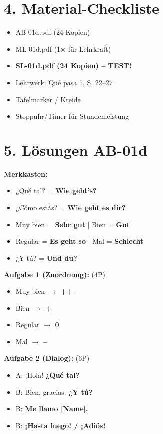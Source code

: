 \documentclass[11pt, a4paper]{article}
\newcommand{\sequenz}{01}
\newcommand{\block}{d}
\newcommand{\lerngruppengroesse}{24}
\newcommand{\loesung}[1]{\textcolor{loesung}{\textbf{#1}}}
\begin{document}
\section*{4. Material-Checkliste}

\begin{materialbox}
\begin{itemize}[label=$\square$]
    \item AB-\sequenz\block.pdf (\lerngruppengroesse{} Kopien)
    \item ML-\sequenz\block.pdf (1× für Lehrkraft)
    \item \textbf{SL-\sequenz\block.pdf (\lerngruppengroesse{} Kopien) -- TEST!}
    \item Lehrwerk: Qué pasa 1, S. 22--27
    \item Tafelmarker / Kreide
    \item Stoppuhr/Timer für Stundenleistung
\end{itemize}
\end{materialbox}

\section*{5. Lösungen AB-\sequenz\block}

\textbf{Merkkasten:}
\begin{itemize}
    \item ¿Qué tal? = \loesung{Wie geht's?}
    \item ¿Cómo estás? = \loesung{Wie geht es dir?}
    \item Muy bien = \loesung{Sehr gut} | Bien = \loesung{Gut}
    \item Regular = \loesung{Es geht so} | Mal = \loesung{Schlecht}
    \item ¿Y tú? = \loesung{Und du?}
\end{itemize}

\textbf{Aufgabe 1 (Zuordnung):} (4P)
\begin{itemize}
    \item Muy bien $\rightarrow$ \loesung{++}
    \item Bien $\rightarrow$ \loesung{+}
    \item Regular $\rightarrow$ \loesung{0}
    \item Mal $\rightarrow$ \loesung{--}
\end{itemize}

\textbf{Aufgabe 2 (Dialog):} (6P)
\begin{itemize}
    \item A: ¡Hola! \loesung{¿Qué tal?}
    \item B: Bien, gracias. \loesung{¿Y tú?}
    \item B: \loesung{Me llamo [Name].}
    \item B: \loesung{¡Hasta luego! / ¡Adiós!}
\end{itemize}
\end{document}

